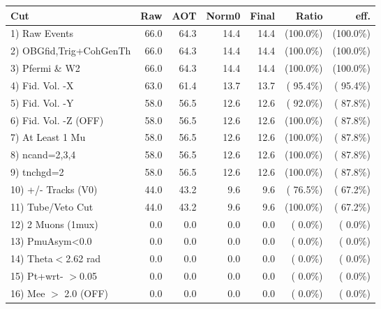  \begin{table}[h!]\centering
 \begin{tabular}{||l||r|r|r|r|r|r||}
 \hline
 \hline
 Cut & Raw & AOT & Norm0 & Final & Ratio & eff.       \\
 \hline
  1) Raw Events           &         66.0 &         64.3 &         14.4 &         14.4 & (100.0\%) & (100.0\%) \\
  2) OBGfid,Trig+CohGenTh &         66.0 &         64.3 &         14.4 &         14.4 & (100.0\%) & (100.0\%) \\
  3) Pfermi \& W2         &         66.0 &         64.3 &         14.4 &         14.4 & (100.0\%) & (100.0\%) \\
  4) Fid. Vol. -X         &         63.0 &         61.4 &         13.7 &         13.7 & ( 95.4\%) & ( 95.4\%) \\
  5) Fid. Vol. -Y         &         58.0 &         56.5 &         12.6 &         12.6 & ( 92.0\%) & ( 87.8\%) \\
  6) Fid. Vol. -Z (OFF)   &         58.0 &         56.5 &         12.6 &         12.6 & (100.0\%) & ( 87.8\%) \\
  7) At Least 1 Mu        &         58.0 &         56.5 &         12.6 &         12.6 & (100.0\%) & ( 87.8\%) \\
  8) ncand=2,3,4          &         58.0 &         56.5 &         12.6 &         12.6 & (100.0\%) & ( 87.8\%) \\
  9) tnchgd=2             &         58.0 &         56.5 &         12.6 &         12.6 & (100.0\%) & ( 87.8\%) \\
 10) +/- Tracks (V0)      &         44.0 &         43.2 &          9.6 &          9.6 & ( 76.5\%) & ( 67.2\%) \\
 11) Tube/Veto Cut        &         44.0 &         43.2 &          9.6 &          9.6 & (100.0\%) & ( 67.2\%) \\
 12) 2 Muons (1mux)       &          0.0 &          0.0 &          0.0 &          0.0 & (  0.0\%) & (  0.0\%) \\
 13) PmuAsym<0.0          &          0.0 &          0.0 &          0.0 &          0.0 & (  0.0\%) & (  0.0\%) \\
 14) Theta$<$2.62 rad     &          0.0 &          0.0 &          0.0 &          0.0 & (  0.0\%) & (  0.0\%) \\
 15) Pt+wrt- $>$0.05      &          0.0 &          0.0 &          0.0 &          0.0 & (  0.0\%) & (  0.0\%) \\
 16) Mee $>$ 2.0  (OFF)   &          0.0 &          0.0 &          0.0 &          0.0 & (  0.0\%) & (  0.0\%) \\

\end{tabular}
\end{table}
